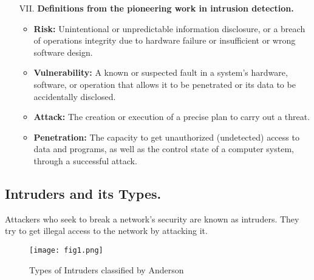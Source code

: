 \documentclass[12pt]{article}
\begin{document}
\begin{enumerate}
        \item[VII.] \textbf{Definitions from the pioneering work in intrusion detection.}
        \begin{itemize}
            \item \textbf{Risk: } Unintentional or unpredictable information disclosure, or a breach of operations integrity due to hardware failure or insufficient or wrong software design.
            \item\textbf{Vulnerability: }A known or suspected fault in a system's hardware, software, or operation that allows it to be penetrated or its data to be accidentally disclosed.
            \item \textbf{Attack: }The creation or execution of a precise plan to carry out a threat.
            \item \textbf{Penetration: }The capacity to get unauthorized (undetected) access to data and programs, as well as the control state of a computer system, through a successful attack.
        \end{itemize}

 
        
    \end{enumerate}
    \cleardoublepage
    
    \subsection{Intruders and its Types.}
    \par Attackers who seek to break a network's security are known as intruders. They try to get illegal access to the network by attacking it.
    \\

    \begin{figure}[h]
        \centering
        \texttt{[image: fig1.png]}
        \caption{Types of Intruders classified by Anderson}
    \end{figure}
    
\end{document}
